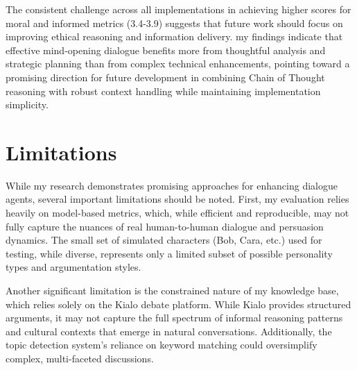 \documentclass[11pt]{article}
\begin{document}
The consistent challenge across all implementations in achieving higher scores for moral and informed metrics (3.4-3.9) suggests that future work should focus on improving ethical reasoning and information delivery. my findings indicate that effective mind-opening dialogue benefits more from thoughtful analysis and strategic planning than from complex technical enhancements, pointing toward a promising direction for future development in combining Chain of Thought reasoning with robust context handling while maintaining implementation simplicity.

\section{Limitations}

While my research demonstrates promising approaches for enhancing dialogue agents, several important limitations should be noted. First, my evaluation relies heavily on model-based metrics, which, while efficient and reproducible, may not fully capture the nuances of real human-to-human dialogue and persuasion dynamics. The small set of simulated characters (Bob, Cara, etc.) used for testing, while diverse, represents only a limited subset of possible personality types and argumentation styles.

Another significant limitation is the constrained nature of my knowledge base, which relies solely on the Kialo debate platform. While Kialo provides structured arguments, it may not capture the full spectrum of informal reasoning patterns and cultural contexts that emerge in natural conversations. Additionally, the topic detection system's reliance on keyword matching could oversimplify complex, multi-faceted discussions.







\end{document}
